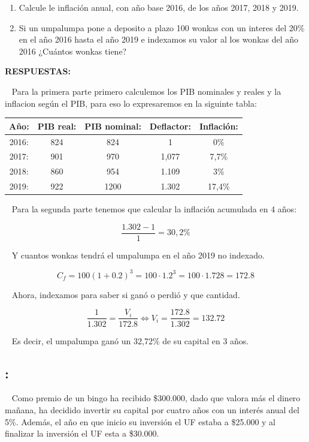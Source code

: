 \documentclass[
  letterpaper,
  DIV=11,
  numbers=noendperiod]{scrreport}
\providecommand{\tightlist}{%
  \setlength{\itemsep}{0pt}\setlength{\parskip}{0pt}}\usepackage{longtable,booktabs,array}
\begin{document}
\begin{enumerate}
\def\labelenumi{\arabic{enumi})}
\tightlist
\item
  Calcule le inflación anual, con año base 2016, de los años 2017, 2018
  y 2019.
\item
  Si un umpalumpa pone a deposito a plazo 100 wonkas con un interes del
  20\% en el año 2016 hasta el año 2019 e indexamos su valor al los
  wonkas del año 2016 ¿Cuántos wonkas tiene?
\end{enumerate}

\textbf{RESPUESTAS:}

~ Para la primera parte primero calculemos los PIB nominales y reales y
la inflacion según el PIB, para eso lo expresaremos en la siguinte
tabla:

\begin{table}[h]
    \centering
    \begin{tabular}{|c|c|c|c|c|}
    \hline
      Año: & PIB real: & PIB nominal: & Deflactor: & Inflación: \\\hline
      2016: & 824 & 824 & 1 & 0\% \\\hline
      2017: & 901 & 970 & 1,077 & 7,7\% \\\hline
      2018: & 860 & 954 & 1.109 & 3\% \\\hline
      2019: & 922 & 1200 & 1.302 & 17,4\% \\\hline
    \end{tabular}
\end{table}

~ Para la segunda parte tenemos que calcular la inflación acumulada en 4
años:

\[
\frac{1.302-1}{1}=30,2\%
\]

~ Y cuantos wonkas tendrá el umpalumpa en el año 2019 no indexado.

\[
C_f=100(1+0.2)^3=100\cdot 1.2^3=100\cdot 1.728=172.8
\]

~ Ahora, indexamos para saber si ganó o perdió y que cantidad.

\[
\frac{1}{1.302}=\frac{V_i}{172.8}\Leftrightarrow V_i=\frac{172.8}{1.302}=132.72
\]

~ Es decir, el umpalumpa ganó un 32,72\% de su capital en 3 años.

\hypertarget{section-34}{%
\subsection{:}\label{section-34}}

~ Como premio de un bingo ha recibido \$300.000, dado que valora más el
dinero mañana, ha decidido invertir su capital por cuatro años con un
interés anual del 5\%. Además, el año en que inicio su inversión el UF
estaba a \$25.000 y al finalizar la inversión el UF esta a \$30.000.
\end{document}
